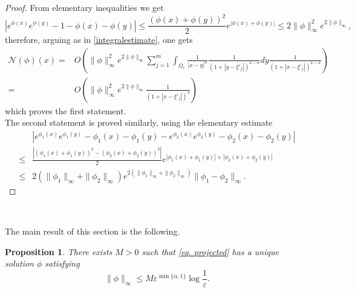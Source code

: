 \documentclass[11pt]{article}
\newtheorem{proposition}{Proposition}[section]
\begin{document}
\begin{proof}
From elementary inequalities we get
$$\left|e^{\phi(x)}e^{\phi(y)}-1-\phi(x)-\phi(y)\right|\le\frac{(\phi(x)+\phi(y))^2}2e^{|\phi(x)+\phi(y)|}\le2\|\phi\|_\infty^2e^{2\|\phi\|_\infty},$$
therefore, arguing as in \eqref{integralestimate}, one gets
\begin{align*}
\mathcal N(\phi)(x)=&O\left(\|\phi\|^2_\infty e^{2\|\phi\|_\infty}\sum_{j=1}^m\int_{\Omega_\varepsilon}\frac1{|x-y|^\alpha}\frac1{\left(1+\left|y-\xi'_j\right|\right)^{4-\alpha}}dy\frac1{\left(1+\left|x-\xi'_j\right|\right)^{4-\alpha}}\right)\\
=&O\left(\|\phi\|^2_\infty e^{2\|\phi\|_\infty}\frac1{\left(1+\left|x-\xi'_j\right|\right)^4}\right)
\end{align*}
which proves the first statement.\\
The second statement is proved similarly, using the elementary estimate
\begin{align*}
&\left|e^{\phi_1(x)}e^{\phi_1(y)}-\phi_1(x)-\phi_1(y)-e^{\phi_2(x)}e^{\phi_2(y)}-\phi_2(x)-\phi_2(y)\right|\\
\le&\frac{\left|(\phi_1(x)+\phi_1(y))^2-(\phi_2(x)+\phi_2(y))^2\right|}2e^{|\phi_1(x)+\phi_1(y)|+|\phi_2(x)+\phi_2(y)|}\\
\le&2(\|\phi_1\|_\infty+\|\phi_2\|_\infty)e^{2(\|\phi_1\|_\infty+\|\phi_2\|_\infty)}\|\phi_1-\phi_2\|_\infty.
\end{align*}
\end{proof}\

The main result of this section is the following.

\begin{proposition}\label{le. unique solu}
There exists $M>0$ such that \eqref{eq. projected} has a unique solution $\phi$ satisfying
$$\|\phi\|_\infty\le M\varepsilon^{\min\{\alpha,1\}}\log\frac1\varepsilon.$$
\end{proposition}
\end{document}

